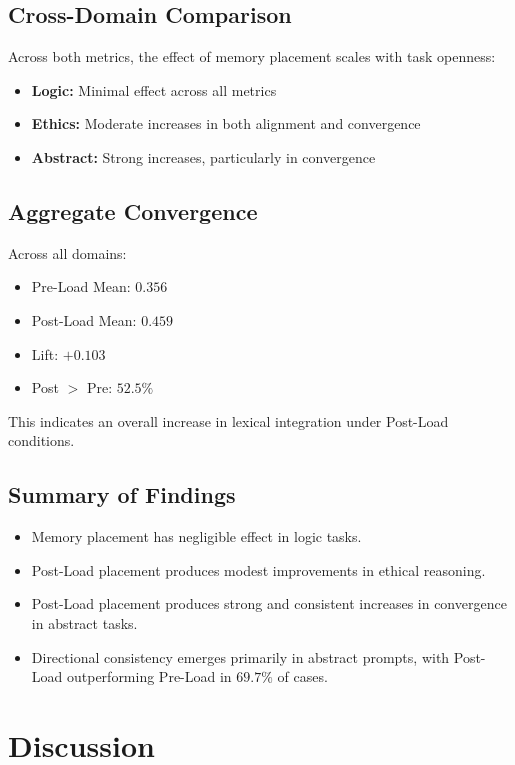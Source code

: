 \documentclass[11pt]{article}
\begin{document}
\subsection{Cross-Domain Comparison}

Across both metrics, the effect of memory placement scales with task openness:

\begin{itemize}
\item \textbf{Logic:} Minimal effect across all metrics
\item \textbf{Ethics:} Moderate increases in both alignment and convergence
\item \textbf{Abstract:} Strong increases, particularly in convergence
\end{itemize}

\subsection{Aggregate Convergence}

Across all domains:

\begin{itemize}
\item Pre-Load Mean: $0.356$
\item Post-Load Mean: $0.459$
\item Lift: $+0.103$
\item Post $>$ Pre: $52.5\%$
\end{itemize}

This indicates an overall increase in lexical integration under Post-Load conditions.

\subsection{Summary of Findings}

\begin{itemize}
\item Memory placement has negligible effect in logic tasks.
\item Post-Load placement produces modest improvements in ethical reasoning.
\item Post-Load placement produces strong and consistent increases in convergence in abstract tasks.
\item Directional consistency emerges primarily in abstract prompts, with Post-Load outperforming Pre-Load in $69.7\%$ of cases.
\end{itemize}

\section{Discussion}
\end{document}
